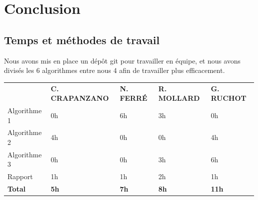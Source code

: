 \documentclass{scrreprt}
\begin{document}
\chapter{Conclusion}


\section{Temps et méthodes de travail}
Nous avons mis en place un dépôt git pour travailler en équipe, et nous avons divisés les 6 algorithmes entre nous 4 afin de travailler plus efficacement.

\begin{tabular}{lllll}
                                          & \textbf{C. CRAPANZANO} & \textbf{N. FERRÉ} & \textbf{R. MOLLARD} & \textbf{G. RUCHOT} \\
Algorithme 1                              & 0h                         & 6h                     & 3h                       & 0h            \\
Algorithme 2                              & 4h                         & 0h                     & 0h                       & 4h            \\
Algorithme 3                              & 0h                         & 0h                     & 3h                       & 6h            \\
Rapport                                   & 1h                         & 1h                     & 2h                       & 1h            \\
\textbf{Total}                            & \textbf{5h}               & \textbf{7h}           & \textbf{8h}             & \textbf{11h}
\end{tabular}
\end{document}
